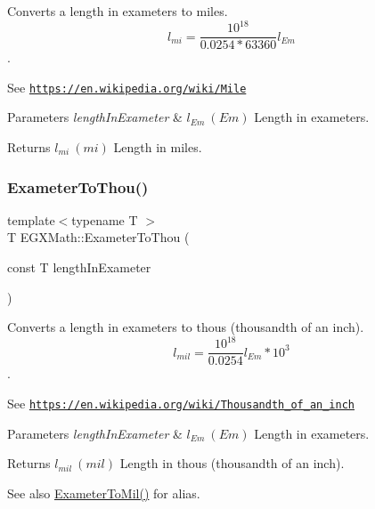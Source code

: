 Converts a length in exameters to miles. \[ l_{mi}=\frac{10^{18}}{0.0254 * 63360} l_{Em} \]. 

See \href{https://en.wikipedia.org/wiki/Mile}{\tt https\+://en.\+wikipedia.\+org/wiki/\+Mile} 
\begin{DoxyParams}{Parameters}
{\em length\+In\+Exameter} & $ l_{Em}\ (Em)$ Length in exameters. \\
\hline
\end{DoxyParams}
\begin{DoxyReturn}{Returns}
$ l_{mi}\ (mi)$ Length in miles. 
\end{DoxyReturn}
\mbox{\label{group___e_g_x_math-_conversions-_length_conversions-_exameter-_imperial_gafee1930a425fcae4f9a3d8631aa62b05}} 
\subsubsection{\texorpdfstring{Exameter\+To\+Thou()}{ExameterToThou()}}
{\footnotesize\ttfamily template$<$typename T $>$ \\
T E\+G\+X\+Math\+::\+Exameter\+To\+Thou (\begin{DoxyParamCaption}\item[{const T}]{length\+In\+Exameter }\end{DoxyParamCaption})}



Converts a length in exameters to thous (thousandth of an inch). \[ l_{mil}= \frac{10^{18}}{0.0254} l_{Em} * 10^{3} \]. 

See \href{https://en.wikipedia.org/wiki/Thousandth_of_an_inch}{\tt https\+://en.\+wikipedia.\+org/wiki/\+Thousandth\+\_\+of\+\_\+an\+\_\+inch} 
\begin{DoxyParams}{Parameters}
{\em length\+In\+Exameter} & $ l_{Em}\ (Em)$ Length in exameters. \\
\hline
\end{DoxyParams}
\begin{DoxyReturn}{Returns}
$ l_{mil}\ (mil)$ Length in thous (thousandth of an inch). 
\end{DoxyReturn}
\begin{DoxySeeAlso}{See also}
\mbox{\hyperlink{group___e_g_x_math-_conversions-_length_conversions-_exameter-_imperial_ga863f9f7f7e2826324fec642027c48614}{Exameter\+To\+Mil()}} for alias. 
\end{DoxySeeAlso}
\mbox{\label{group___e_g_x_math-_conversions-_length_conversions-_exameter-_imperial_gaaa37d3bd7aa2c3a8756ca2e2830bf8ac}} 
